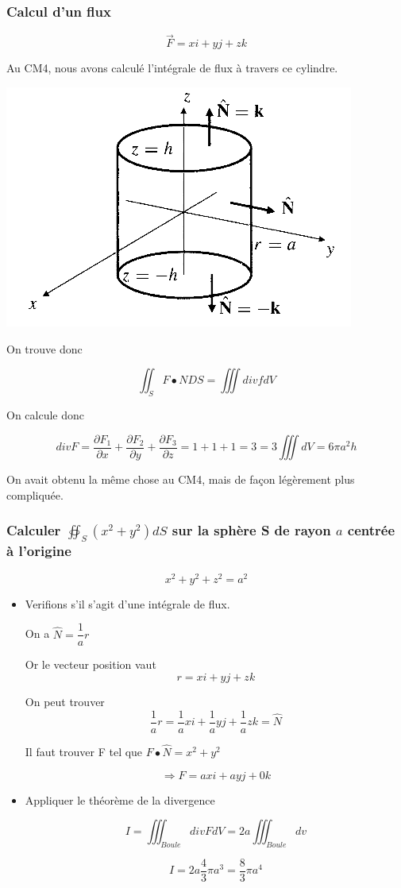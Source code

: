 \subsubsection{Calcul d'un flux}
\[\vec F = x i + y j + z k \]

Au CM4, nous avons calculé l'intégrale de flux à travers ce cylindre.

\includegraphics[scale=0.7]{image6.png}

On trouve donc

\[\iint_S F \bullet N DS = \iiint div f dV\]

On calcule donc

\[div F = \frac{\partial F_1}{\partial x}+ \frac{\partial F_2}{\partial y} + \frac{\partial F_3}{\partial z}= 1+1+1=3 = 3 \iiint dV = 6 \pi a^2 h\]

On avait obtenu la même chose au CM4, mais de façon légèrement plus compliquée.

\subsubsection{Calculer $\oiint_S(x^2+y^2)dS$ sur la sphère S de rayon $a$ centrée à l'origine}

\[x^2+y^2+z^2 = a^2\]

\begin{itemize}

\item Verifions s'il s'agit d'une intégrale de flux.

On a $\hat N = \dfrac{1}{a} r $

Or le vecteur position vaut
\[r = xi +yj +zk\]

On peut trouver
\[\dfrac{1}{a}r = \dfrac{1}{a}xi +\dfrac{1}{a}yj +\dfrac{1}{a}zk = \hat N\]

Il faut trouver F tel que $F\bullet \hat N = x^2 + y ^2 $

\[\Rightarrow F = axi +ayj +0k \]
\item Appliquer le théorème de la divergence

$$ I = \iiint_{Boule} div F dV = 2a \iiint_{Boule}dv$$

\[I = 2a \dfrac{4}{3}\pi a^3 = \dfrac{8}{3}\pi a^4\]
\end{itemize}


